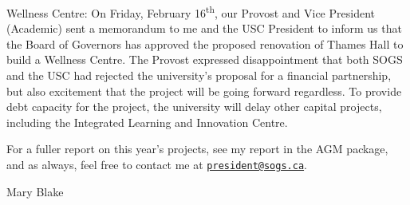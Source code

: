 Wellness Centre: On Friday, February 16\textsuperscript{th}, our Provost
and Vice President (Academic) sent a memorandum to me and the USC
President to inform us that the Board of Governors has approved the
proposed renovation of Thames Hall to build a Wellness Centre. The
Provost expressed disappointment that both SOGS and the USC had rejected
the university's proposal for a financial partnership, but also
excitement that the project will be going forward regardless. To provide
debt capacity for the project, the university will delay other capital
projects, including the Integrated Learning and Innovation Centre.

For a fuller report on this year's projects, see my report in the AGM
package, and as always, feel free to contact me at
\href{mailto:president@sogs.ca}{\nolinkurl{president@sogs.ca}}.

Mary Blake


